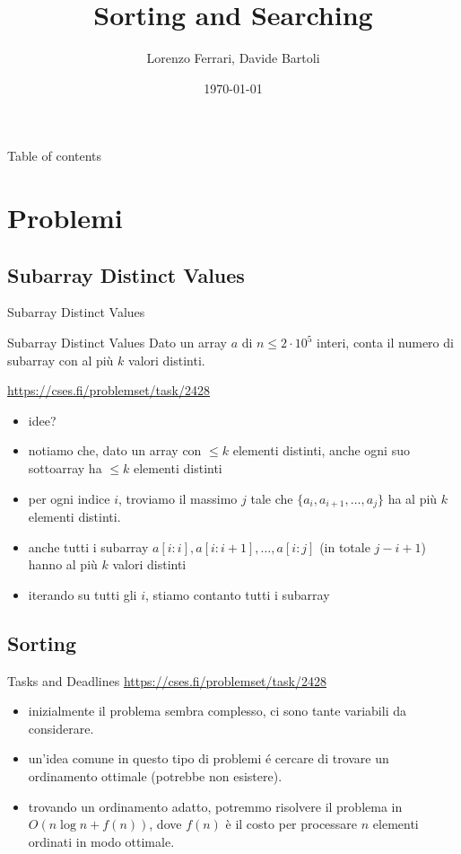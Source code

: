 \documentclass[compress]{beamer}
\title{Sorting and Searching}
\author{Lorenzo Ferrari, Davide Bartoli}
\date{\today}
\begin{document}
\begin{frame}
  \maketitle
\end{frame}

\begin{frame}{Table of contents}
  \tableofcontents
\end{frame}

\section{Problemi}

\subsection{Subarray Distinct Values}
\begin{frame}{Subarray Distinct Values}
    \begin{exampleblock}{Subarray Distinct Values}
        Dato un array $a$ di $n \leq 2 \cdot 10^5$ interi, conta il numero di subarray con al pi\`u $k$ valori distinti.
    \end{exampleblock}
    \underline{\url{https://cses.fi/problemset/task/2428}}
    \pause
    \begin{itemize}
        \item idee?
        \pause
        \item notiamo che, dato un array con $\leq k$ elementi distinti, anche ogni suo sottoarray ha $\leq k$ elementi distinti
        \pause
        \item per ogni indice $i$, troviamo il massimo $j$ tale che $\{ a_i, a_{i+1}, \dots, a_{j} \}$ ha al pi\`u $k$ elementi distinti.
        \pause
        \item anche tutti i subarray $a[i:i], a[i:i+1], \dots, a[i:j]$ (in totale $j-i+1$) hanno al pi\`u $k$ valori distinti
        \pause
        \item iterando su tutti gli $i$, stiamo contanto tutti i subarray
    \end{itemize}
\end{frame}

\subsection{Sorting}
\begin{frame}{Tasks and Deadlines}
    \underline{\url{https://cses.fi/problemset/task/2428}}
    \pause
    \begin{itemize}
        \item inizialmente il problema sembra complesso, ci sono tante variabili da considerare.
        \pause
        \item un'idea comune in questo tipo di problemi \'e cercare di trovare un ordinamento ottimale (potrebbe non esistere).
        \pause 
\item trovando un ordinamento adatto, potremmo risolvere il problema in $O(n \log n + f(n))$, dove $f(n)$ \`e il costo per processare $n$ elementi ordinati in modo ottimale.
    \end{itemize}
\end{frame}
\end{document}
